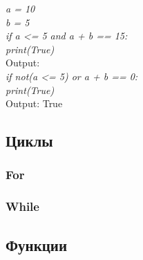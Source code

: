 \begin{flushleft}
	\colorbox[rgb]{0.95, 0.95, 0.95}{\textit{a = 10}} \\
	\colorbox[rgb]{0.95, 0.95, 0.95}{\textit{b = 5}} \\
	\colorbox[rgb]{0.95, 0.95, 0.95}{\textit{if a <= 5 and a + b == 15:}} \\
	\colorbox[rgb]{0.95, 0.95, 0.95}{\hspace{1cm} \textit{print(True)}} \\
	\colorbox[rgb]{0.95, 0.95, 0.95}{Output:} \\
	\vspace{1cm}
	\colorbox[rgb]{0.95, 0.95, 0.95}{\textit{if not(a <= 5) or a + b == 0:}} \\
	\colorbox[rgb]{0.95, 0.95, 0.95}{\hspace{1cm} \textit{print(True)}} \\
	\colorbox[rgb]{0.95, 0.95, 0.95}{Output: True} \\
	
\end{flushleft}


\newpage
{}
\subsection*{Циклы}

\subsubsection*{For}

\subsubsection*{While}

\newpage
{}
\subsection*{Функции}